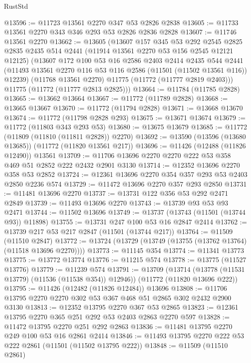 \begin{lexlean}{RustStd}
\begin{coremodule}
@13596 := @11723 @13561 @2270 @347 @53 @2826 @2838
@13605 := @11733 @13561 @2270 @343 @346 @293 @53 @2826 @2836 @2828
@13607 := @11746 @13561 @2270
@13662 := @13605
    (@13607
      @157
      @345
      @53
      @292
      @2545
      @2825
      @2835
      @2435
      @514
      @2441
      (@11914 @13561 @2270 @53 @156 @2545 @12121 @12125)
      (@13607
        @172
        @100
        @53
        @16
        @2586
        @2403
        @2414
        @2435
        @544
        @2441
        (@11493 @13561 @2270 @116 @53 @116 @2586 (@11501 (@11502 @13561 @116)) @12239)
        (@11768 @13561 @2270)
        @11775
        (@11772 (@11777 @2819 @2403)))
      @11775
      (@11772 (@11777 @2813 @2825)))
@13664 := @11784 (@11785 @2828)
@13665 := @13662 @13664
@13667 := @11772 (@11789 @2828)
@13668 := @13665 @13667
@13670 := @11772 (@11794 @2828)
@13671 := @13668 @13670
@13674 := @11772 (@11798 @2828 @293)
@13675 := @13671 @13674
@13679 := @11772 (@11803 @343 @293 @53)
@13680 := @13675 @13679
@13685 := @11772 (@11809 (@11810 (@11811 @2828)) @2270)
@13692 := @13590 (@13596 (@13680 @13685)) (@11772 (@11820 @13561 @217))
@13696 := @11426 (@12488 (@11826 @12490)) @13561
@13709 := @11706 @13696 @2270 @2270 @222 @53 @358 @469 @51 @2852 @222 @2432 @2901 @3130
@13714 := @12352 @13696 @2270 @358 @53 @2852
@13724 := @12361 @13696 @2270 @354 @357 @293 @53 @2403 @2850 @2236 @574
@13729 := @11472 @13696 @2270 @357 @293 @2850
@13731 := @11481 @13696 @2270
@13737 := @13731 @122 @356 @53 @292 @2471 @2849
@13739 := @11493 @13696 @2270
@13743 := @13739 @93 @53 @93 @2471
@13744 := @11502 @13696
@13749 := @13737 (@13743 (@11501 (@13744 @93)) @11898)
@13755 := @13731 @247 @100 @53 @16 @2847 @2414
@13762 := @13739 @217 @53 @217 @2847 (@11501 (@13744 @217))
@13764 := @11509 (@11510 @2847)
@13772 := @13724 (@13729 (@13749 (@13755 (@13762 @13764) (@11518 @13696 @2270))))
@13773 := @11145 @354
@13774 := @11341 @13773
@13775 := @13772 @13774
@13776 := @11215 @574
@13778 := @13775 (@11527 @13776)
@13779 := @11239 @574
@13791 := @13709
    (@13714 (@13778 (@11531 @13779) (@11536 (@11538 @354)) @12946))
    (@11772 (@11820 @13696 @222))
@13795 := @11426 (@12482 (@11826 @12484)) @13696
@13808 := @11706 @13795 @2270 @2270 @302 @53 @367 @468 @51 @2865 @302 @2432 @2900 @3130
@13813 := @12352 @13795 @2270 @367 @53 @2865
@13823 := @12361 @13795 @2270 @365 @251 @292 @53 @2403 @2863 @2270 @597
@13828 := @11472 @13795 @2270 @251 @292 @2863
@13836 := @11481 @13795 @2270 @249 @100 @53 @16 @2861 @2414
@13846 := @11493 @13795 @2270 @222 @53 @222 @2861 (@11501 (@11502 @13795 @222))
@13848 := @11509 (@11510 @2861)

\end{coremodule}
\end{lexlean}
